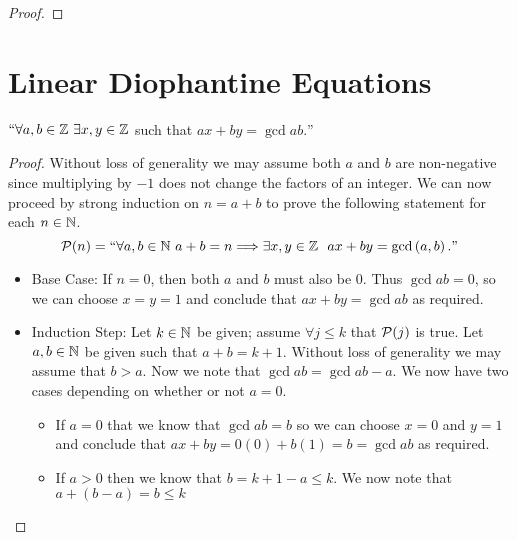         \begin{theorem}
        \end{theorem}
        \begin{proof}
        \end{proof}
    \section{Linear Diophantine Equations}
        \begin{theorem}
            $``\forall a, b \in \mathbb{Z} \ \exists x, y \in \mathbb{Z}$ such that $ax + by = \gcd{a}{b}.$''
            \label{lineardiophantinegcd}
        \end{theorem}
        \begin{proof}
            Without loss of generality we may assume both
            $a$ and $b$ are non-negative since multiplying by $-1$ does not change the factors
            of an integer. We can now proceed by strong induction
            on $n = a + b$ to prove the following statement for each $n \in \mathbb{N}$.
            \[
                \inductive{P}{n} = ``\forall a , b \in \set{N} \ 
                a + b = n \then \exists x, y \in \set{Z} \ \ ax + by = \gcd{a}{b}."
            \]
            \begin{itemize}
                \item
                    Base Case: If $n = 0$, then both $a$ and $b$ must also be 0. Thus $\gcd{a}{b} = 0$,
                    so we can choose $x = y = 1$ and conclude that $ax + by = \gcd{a}{b}$ as required.
                \item
                    Induction Step: Let $k \in \mathbb{N}$ be given; assume  $\forall j \le k$
                    that $\mathcal{P}(j)$ is true. Let $a, b \in \mathbb{N}$ be given such
                    that $a + b = k + 1$. Without loss of generality we may assume that $b > a$.
                    Now we note that $\gcd{a}{b} = \gcd{a}{b - a}$. We now have two cases 
                    depending on whether or not $a = 0$.
                    \begin{itemize}
                        \item
                            If $a = 0$ that we know that $\gcd{a}{b} = b$ so we can choose $x = 0$ and $y = 1$
                            and conclude that $ax + by = 0(0) + b(1) = b = \gcd{a}{b}$ as required.
                        \item
                            If $a > 0$ then we know that $b = k + 1 - a \le k$. We now note that $a + (b - a) = b \le k$

\end{itemize}
\end{itemize}
\end{proof}
